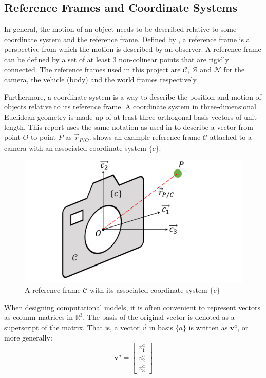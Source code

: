 \documentclass{UoNMCHA}
\numberwithin{equation}{section}
\begin{document}
\subsection{Reference Frames and Coordinate Systems}\label{sec:ReferenceFrames}
In general, the motion of an object needs to be described relative to some coordinate system and the reference frame. Defined by \cite{3900Notes}, a reference frame is a perspective from which the motion is described by an observer. A reference frame can be defined by a set of at least 3 non-colinear points that are rigidly connected. The reference frames used in this project are $\mathcal{C}$, $\mathcal{B}$ and $\mathcal{N}$ for the camera, the vehicle (body) and the world frames respectively.

Furthermore, a coordinate system is a way to describe the position and motion of objects relative to its reference frame. A coordinate system in three-dimensional Euclidean geometry is made up of at least three orthogonal basis vectors of unit length. This report uses the same notation as used in \cite{3900Notes} to describe a vector from point $O$ to point $P$ as $\vec{r}_{P/O}$.  shows an example reference frame $\mathcal{C}$ attached to a camera with an associated coordinate system $\{c\}$.

\begin{figure}[ht]
    \begin{center}
        \includegraphics[width=.6\linewidth]{Figures/ReferenceFrame}
        \caption{A reference frame $\mathcal{C}$ with its associated coordinate system $\{c\}$}
        \label{fig:ReferenceFrame}
    \end{center}
\end{figure}

When designing computational models, it is often convenient to represent vectors as column matrices in $\mathbb{R}^3$. The basis of the original vector is denoted as a superscript of the matrix. That is, a vector $\vec{v}$ in basis $\{a\}$ is written as $\mathbf{v}^a$, or more generally: 
\begin{equation}
	\mathbf{v}^a = 
	\begin{bmatrix}
		v^{a}_1\\
		v^{a}_2\\
		v^{a}_3
	\end{bmatrix}
\end{equation}
\end{document}
